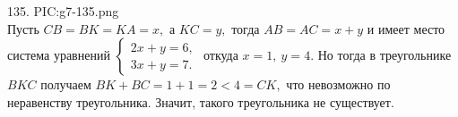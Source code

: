 135. {{PIC:g7-135.png}}\\
Пусть $CB=BK=KA=x,$ а $KC=y,$ тогда $AB=AC=x+y$ и имеет место система уравнений $\begin{cases} 2x+y=6,\\ 3x+y=7.\end{cases}$ откуда $x=1,\ y=4.$ Но тогда в треугольнике $BKC$ получаем $BK+BC=1+1=2<4=CK,$ что невозможно по неравенству треугольника. Значит, такого треугольника не существует.\\
